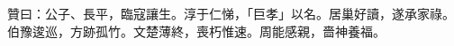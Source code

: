 \begin{pinyinscope}
贊曰：公子、長平，臨寇讓生。淳于仁悌，「巨孝」以名。居巢好讀，遂承家祿。伯豫逡巡，方跡孤竹。文楚薄終，喪朽惟速。周能感親，嗇神養福。


\end{pinyinscope}